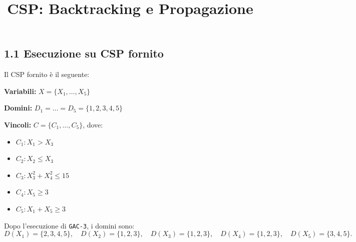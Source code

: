 \documentclass[a4paper,11pt]{article}
\title{CSP: Backtracking e Propagazione}
\date{}
\begin{document}
\maketitle

\subsection*{1.1 Esecuzione su CSP fornito}

Il CSP fornito è il seguente:

\textbf{Variabili:} $X = \{X_1, \dots,  X_5\}$


\textbf{Domini:} $D_1 = \dots = D_5 = \{1, 2, 3, 4, 5\}$


\textbf{Vincoli:} $C = \{C_1, \dots, C_5\}$, dove:

\begin{itemize}
  \item $C_1: X_1 > X_3$
  \item $C_2: X_2 \leq X_3$
  \item $C_3: X_3^2 + X_4^2 \leq 15$
  \item $C_4: X_5 \geq 3$
  \item $C_5: X_1 + X_5 \geq 3$
\end{itemize}

Dopo l'esecuzione di \texttt{GAC-3}, i domini sono:
\[
D(X_1) = \{2, 3, 4, 5\}, \quad D(X_2) = \{1, 2, 3\}, \quad D(X_3) = \{1, 2, 3\}, \quad D(X_4) = \{1, 2, 3\}, \quad D(X_5) = \{3, 4, 5\}.
\]
\end{document}
